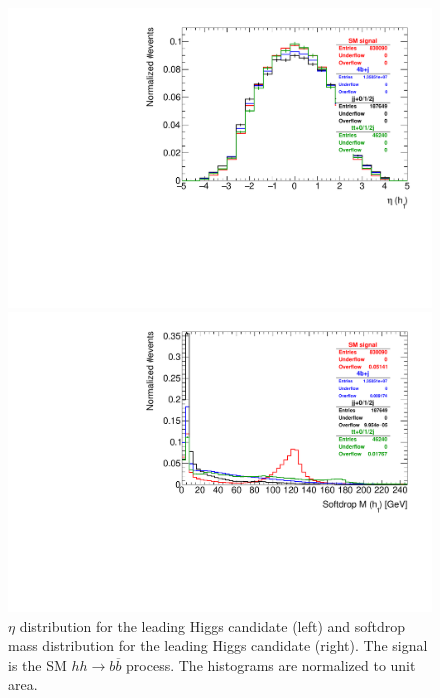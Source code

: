 \begin{figure}
	\centering
	\begin{minipage}{.5\textwidth}
		\centering
		\includegraphics[trim={.65cm 0 0 0},clip,width=\linewidth]{./Figures/hist_h1_eta.pdf}
	\end{minipage}%
	\begin{minipage}{.5\textwidth}
		\centering
		\includegraphics[trim={0 0 .65cm 0},clip,width=\linewidth]{./Figures/hist_h1_softdrop_M.pdf}
	\end{minipage}
	\label{fig:h1_eta_M}
	\caption{$\eta$ distribution for the leading Higgs candidate (left) and softdrop mass distribution for the leading Higgs candidate (right). The signal is the SM $hh\rightarrow b\overline{b}$ process. The histograms are normalized to unit area.}
\end{figure}	

